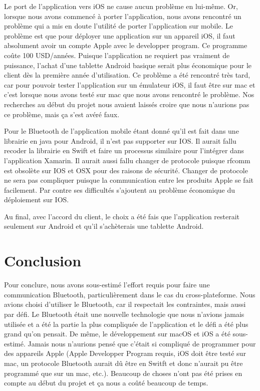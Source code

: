 \documentclass[12pt,fleqn]{article}
\begin{document}
Le port de l’application vers iOS ne cause aucun problème en lui-même. Or, lorsque nous avons commencé à porter l’application, nous avons rencontré un problème qui a mis en doute l’utilité de porter l’application sur mobile. Le problème est que pour déployer une application sur un appareil iOS, il faut absolument avoir un compte Apple avec le developper program. Ce programme coûte 100 USD/années. Puisque l’application ne requiert pas vraiment de puissance, l’achat d’une tablette Android basique serait plus économique pour le client dès la première année d’utilisation. Ce problème a été rencontré très tard, car pour pouvoir tester l’application sur un émulateur iOS, il faut être sur mac et c’est lorsque nous avons testé sur mac que nous avons rencontré le problème. Nos recherches au début du projet nous avaient laissés croire que nous n’aurions pas ce problème, mais ça s’est avéré faux.

Pour le Bluetooth de l'application mobile étant donné qu'il est fait dans une librairie en java pour Android, il n'est pas supporter sur IOS. Il aurait fallu recoder la librairie en Swift et faire un processus similaire pour l'intégrer dans l'application Xamarin. Il aurait aussi fallu changer de protocole puisque rfcomm est obsolète sur IOS et OSX pour des raisons de sécurité. Changer de protocole ne sera pas compliquer puisque la communication entre les produits Apple se fait facilement. Par contre ses difficultés s'ajoutent au problème économique du déploiement sur IOS.

Au final, avec l’accord du client, le choix a été fais que l’application resterait seulement sur Android et qu’il s’achèterais une tablette Android.





\section{Conclusion}
Pour conclure, nous avons sous-estimé l’effort requis pour faire une communication Bluetooth, particulièrement dans le cas du cross-plateforme. Nous avions choisi d’utiliser le Bluetooth, car il respectait les contraintes, mais aussi par défi. Le Bluetooth était une nouvelle technologie que nous n’avions jamais utilisée et a été la partie la plus compliquée de l’application et le défi a été plus grand qu’on pensait. De même, le développement sur macOS et iOS a été sous-estimé. Jamais nous n’aurions pensé que c’était si compliqué de programmer pour des appareils Apple (Apple Developper Program requis, iOS doit être testé sur mac, un protocole Bluetooth aurait dû être en Switft et donc n’aurait pu être programmé que sur un mac, etc.). Beaucoup de choses n’ont pas été prises en compte au début du projet et ça nous a coûté beaucoup de temps.
\end{document}
